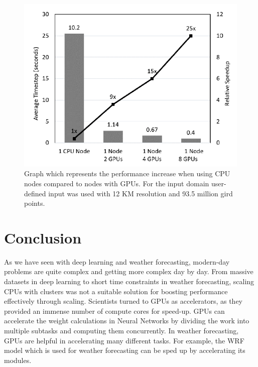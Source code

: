 \documentclass[conference]{IEEEtran}
\begin{document}
\begin{figure}[H]
    \centering
    \includegraphics[scale=0.45]{Performance_two.png}
    \caption{Graph which represents the performance increase when using CPU nodes compared to nodes with GPUs. For the input domain user-defined input was used with 12 KM resolution and 93.5 million gird points. \cite{b13}}
    \label{fig:Perf_Graph_2}
\end{figure}


\section{Conclusion}
As we have seen with deep learning and weather forecasting, modern-day problems are quite complex and getting more complex day by day. From massive datasets in deep learning to short time constraints in weather forecasting, scaling CPUs with clusters was not a suitable solution for boosting performance effectively through scaling. Scientists turned to GPUs as accelerators, as they provided an immense number of compute cores for speed-up. GPUs can accelerate the weight calculations in Neural Networks by dividing the work into multiple subtasks and computing them concurrently. In weather forecasting, GPUs are helpful in accelerating many different tasks. For example, the WRF model which is used for weather forecasting can be sped up by accelerating its modules.
\end{document}
